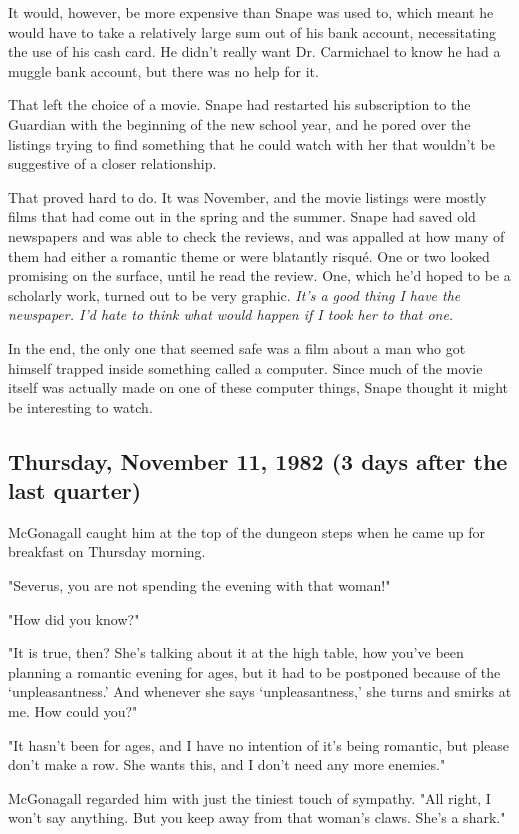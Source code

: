 \documentclass[a4paper,11pt]{article}
\begin{document}
It would, however, be more expensive than Snape was used to, which meant he would have to take a relatively large sum out of his bank account, necessitating the use of his cash card. He didn't really want Dr. Carmichael to know he had a muggle bank account, but there was no help for it.

That left the choice of a movie. Snape had restarted his subscription to the Guardian with the beginning of the new school year, and he pored over the listings trying to find something that he could watch with her that wouldn't be suggestive of a closer relationship.

That proved hard to do. It was November, and the movie listings were mostly films that had come out in the spring and the summer. Snape had saved old newspapers and was able to check the reviews, and was appalled at how many of them had either a romantic theme or were blatantly risqué. One or two looked promising on the surface, until he read the review. One, which he'd hoped to be a scholarly work, turned out to be very graphic. \emph{It's a good thing I have the newspaper. I'd hate to think what would happen if I took her to that one.}

In the end, the only one that seemed safe was a film about a man who got himself trapped inside something called a computer. Since much of the movie itself was actually made on one of these computer things, Snape thought it might be interesting to watch.

\subsection{Thursday, November 11, 1982 (3 days after the last quarter)}

McGonagall caught him at the top of the dungeon steps when he came up for breakfast on Thursday morning.

"Severus, you are not spending the evening with that woman!"

"How did you know?"

"It is true, then? She's talking about it at the high table, how you've been planning a romantic evening for ages, but it had to be postponed because of the `unpleasantness.' And whenever she says `unpleasantness,' she turns and smirks at me. How could you?"

"It hasn't been for ages, and I have no intention of it's being romantic, but please don't make a row. She wants this, and I don't need any more enemies."

McGonagall regarded him with just the tiniest touch of sympathy. "All right, I won't say anything. But you keep away from that woman's claws. She's a shark."
\end{document}
